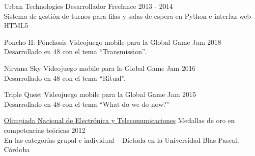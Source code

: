 \documentclass[10pt,a4paper]{article}
\begin{document}
\vspace{0.2em}
\headedsection
    { Urban Technologies }
    { \textsc{} }{
    \headedsubsection
        { Desarrollador Freelance }
        { 2013 - 2014 }
        { \\ Sistema de gestión de turnos para filas y salas de espera en Python e interfaz web HTML5 \href{http://www.eitsa.com.ar/producto.php?c=3&p=14}{\ExternalLink} }
}

\pagebreak

\spacedhrule{0.8em}{-0.4em} %


\vspace{0.2em}
\headedsection
    { Poncho II: Pónchosis \href{https://globalgamejam.org/2018/games/poncho-ii-p\%C3\%B3nchosis}{\ExternalLink} }
    { \textsc{} }{
    \headedsubsection
        { Videojuego mobile para la Global Game Jam }
        { 2018 }
        { \\ Desarrollado en 48 con el tema ``Transmission''. }
}

\vspace{0.2em}
\headedsection
    { Nirvana Sky \href{http://globalgamejam.org/2016/games/nirvana-sky}{\ExternalLink} }
    { \textsc{} }{
    \headedsubsection
        { Videojuego mobile para la Global Game Jam }
        { 2016 }
        { \\ Desarrollado en 48 con el tema ``Ritual''. }
}

\vspace{0.2em}
\headedsection
    { Triple Quest \href{http://globalgamejam.org/2015/games/triple-quest}{\ExternalLink} }
    { \textsc{} }{
    \headedsubsection
        { Videojuego mobile para la Global Game Jam }
        { 2015 }
        { \\ Desarrollado en 48 con el tema ``What do we do now?'' }
}

\vspace{0.2em}
\headedsection
    { \href{}{Olimpiada Nacional de Electrónica y Telecomunicaciones} }
    { \textsc{} }{
    \headedsubsection
        { Medallas de oro en competencias teóricas }
        { 2012 }
        { \\ En las categorías grupal e individual -- Dictada en la Universidad Blas Pascal, Córdoba }
}
\end{document}
